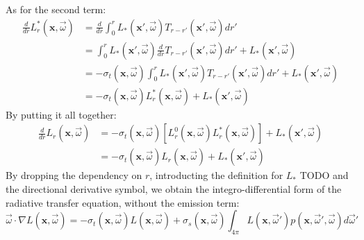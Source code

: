 As for the second term:
\begin{equation}
\begin{split}
\frac{d}{dr} L^*_r(\mathbf{x}, \vec{\omega}) &= \frac{d}{dr} \int_0^r L_*(\mathbf{x}', \vec{\omega}) T_{r-r'}(\mathbf{x}', \vec{\omega})  dr' \\
&= \int_0^r L_*(\mathbf{x}', \vec{\omega}) \frac{d}{dr} T_{r-r'}(\mathbf{x}', \vec{\omega})  dr' + L_*(\mathbf{x}', \vec{\omega})
 \\
 &= -\sigma_t(\mathbf{x}, \vec{\omega})  \int_0^r L_*(\mathbf{x}', \vec{\omega}) T_{r-r'}(\mathbf{x}', \vec{\omega})  dr' + L_*(\mathbf{x}', \vec{\omega}) \\
 &= -\sigma_t(\mathbf{x}, \vec{\omega}) L^*_r(\mathbf{x}, \vec{\omega}) + L_*(\mathbf{x}', \vec{\omega})
\end{split}
\end{equation}
By putting it all together:
\begin{equation}
\begin{split}
\frac{d}{dr} L_r(\mathbf{x}, \vec{\omega}) &= -\sigma_t(\mathbf{x}, \vec{\omega}) [L^0_r(\mathbf{x}, \vec{\omega}) L^*_r(\mathbf{x}, \vec{\omega})] + L_*(\mathbf{x}', \vec{\omega}) \\
&=  -\sigma_t(\mathbf{x}, \vec{\omega}) L_r(\mathbf{x}, \vec{\omega}) +  L_*(\mathbf{x}', \vec{\omega}) 
\end{split}
\end{equation}
By dropping the dependency on $r$, introducting the definition for $L_*$ TODO and the directional derivative symbol, we obtain the integro-differential form of the radiative  transfer equation, without the emission term:
$$\vec{\omega} \cdot \nabla L(\mathbf{x}, \vec{\omega}) = - \sigma_t(\mathbf{x}, \vec{\omega}) L(\mathbf{x}, \vec{\omega}) + \sigma_s(\mathbf{x}, \vec{\omega}) \int_{4\pi} L(\mathbf{x}, \vec{\omega}')  p(\mathbf{x}, \vec{\omega}', \vec{\omega}) d \vec{\omega}'$$
